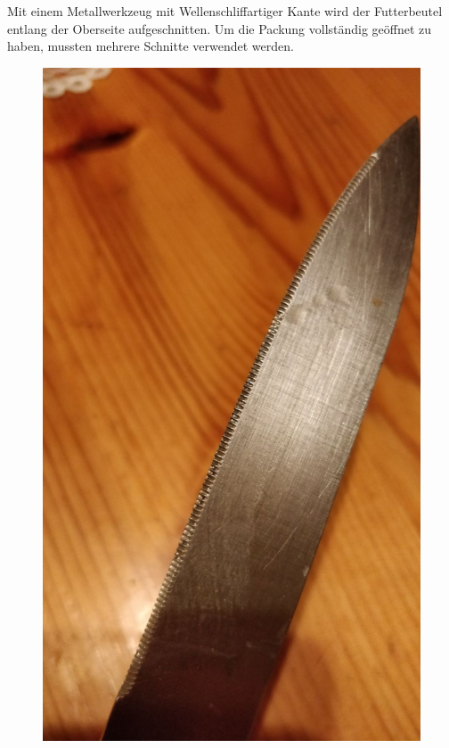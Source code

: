 \documentclass[a4paper,12pt]{scrartcl}
\begin{document}
Mit einem Metallwerkzeug mit Wellenschliffartiger Kante wird der Futterbeutel entlang der Oberseite aufgeschnitten. Um die Packung vollständig geöffnet zu haben, mussten mehrere Schnitte verwendet werden.\\

\begin{figure}[H]
   \begin{minipage}[hbt]{.3\linewidth} %
      \includegraphics[width=\linewidth]{Bilder/Schneideversuch_2.Art/Schneidemittel}

\end{minipage}
\end{figure}
\end{document}
